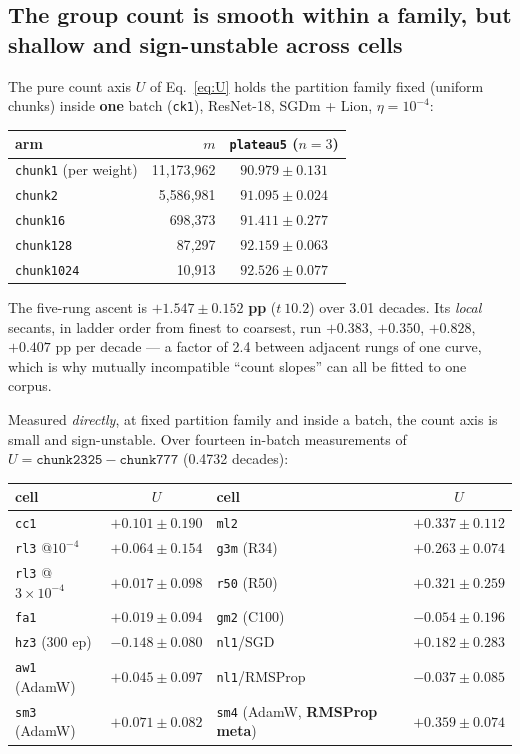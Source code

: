 \documentclass[10pt,letterpaper]{article}
\newcommand{\Ustat}{U}                         %
\newcommand{\plateau}{\texttt{plateau5}}
\newcommand{\arm}[1]{\texttt{#1}}
\begin{document}
\subsection{The group count is smooth within a family, but shallow and sign-unstable across
cells}
\label{sec:count}

The pure count axis $\Ustat$ of Eq.~\ref{eq:U} holds the partition family fixed (uniform chunks)
inside \textbf{one} batch (\arm{ck1}),
ResNet-18, SGDm + Lion, $\eta = 10^{-4}$:

\begin{center}
\small
\begin{tabular}{@{}lrc@{}}
\toprule
arm & $m$ & \plateau{} ($n{=}3$) \\
\midrule
\arm{chunk1} (per weight) & 11{,}173{,}962 & $90.979 \pm 0.131$ \\
\arm{chunk2}    & 5{,}586{,}981 & $91.095 \pm 0.024$ \\
\arm{chunk16}   & 698{,}373 & $91.411 \pm 0.277$ \\
\arm{chunk128}  & 87{,}297 & $92.159 \pm 0.063$ \\
\arm{chunk1024} & 10{,}913 & $92.526 \pm 0.077$ \\
\bottomrule
\end{tabular}
\end{center}

The five-rung ascent is $\mathbf{+1.547 \pm 0.152}$ \textbf{pp} ($t\ 10.2$) over 3.01 decades.
Its \emph{local} secants, in ladder order from finest to coarsest, run $\mathbf{+0.383}$,
$\mathbf{+0.350}$, $\mathbf{+0.828}$, $\mathbf{+0.407}$ pp per decade --- a factor of 2.4 between
adjacent rungs of one curve, which is why mutually incompatible ``count slopes'' can all be
fitted to one corpus.

Measured \emph{directly}, at fixed partition family and inside a batch, the count axis is small
and sign-unstable. Over fourteen in-batch measurements of
$\Ustat = \arm{chunk2325} - \arm{chunk777}$ (0.4732 decades):

\begin{center}
\small
\begin{tabular}{@{}lclc@{}}
\toprule
cell & $\Ustat$ & cell & $\Ustat$ \\
\midrule
\arm{cc1} & $+0.101 \pm 0.190$ & \arm{ml2} & $+0.337 \pm 0.112$ \\
\arm{rl3} @$10^{-4}$ & $+0.064 \pm 0.154$ & \arm{g3m} (R34) & $+0.263 \pm 0.074$ \\
\arm{rl3} @$3\!\times\!10^{-4}$ & $+0.017 \pm 0.098$ & \arm{r50} (R50) & $+0.321 \pm 0.259$ \\
\arm{fa1} & $+0.019 \pm 0.094$ & \arm{gm2} (C100) & $-0.054 \pm 0.196$ \\
\arm{hz3} (300 ep) & $-0.148 \pm 0.080$ & \arm{nl1}/SGD & $+0.182 \pm 0.283$ \\
\arm{aw1} (AdamW) & $+0.045 \pm 0.097$ & \arm{nl1}/RMSProp & $-0.037 \pm 0.085$ \\
\arm{sm3} (AdamW) & $+0.071 \pm 0.082$ & \arm{sm4} (AdamW, \textbf{RMSProp meta}) &
  $\mathbf{+0.359 \pm 0.074}$ \\
\bottomrule
\end{tabular}
\end{center}
\end{document}
